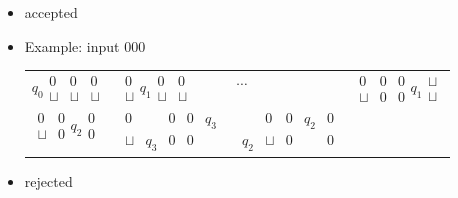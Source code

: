 \begin{frame}[allowframebreaks]
\begin{itemize}
\item [] accepted
  
\item Example: input 000

\renewcommand{\arraystretch}{1.7}  
  \begin{tabular}{llll}
$ q_0
\begin{smallmatrix}
  0 &0 & 0 \\
  \sqcup & \sqcup & \sqcup 
\end{smallmatrix}
$
&
$
\begin{smallmatrix}
  0 \\
  \sqcup 
\end{smallmatrix}
q_1
\begin{smallmatrix}
  0 & 0  \\
  \sqcup & \sqcup 
\end{smallmatrix}
$
&           
$\cdots
$
&
$
\begin{smallmatrix}
  0 & 0 & 0 \\
  \sqcup & 0  & 0 
\end{smallmatrix}
q_1
\begin{smallmatrix}
  \sqcup\\
  \sqcup 
\end{smallmatrix}
$
\\
$
\begin{smallmatrix}
  0 & 0  \\
  \sqcup  & 0 
\end{smallmatrix}
q_2
\begin{smallmatrix}
  0\\
  0
\end{smallmatrix}
$
&
$
\begin{smallmatrix}
  0 & & 0 & 0 & q_3\\
  \sqcup & q_3 & 0 & 0 &
\end{smallmatrix}
$
& 
$
\begin{smallmatrix}
  & 0  &  0 & q_2 & 0\\
  q_2 & \sqcup & 0 &  & 0 
\end{smallmatrix}
$
&
\end{tabular}
\renewcommand{\arraystretch}{1}

\item [] rejected

\end{itemize}

\end{frame}

